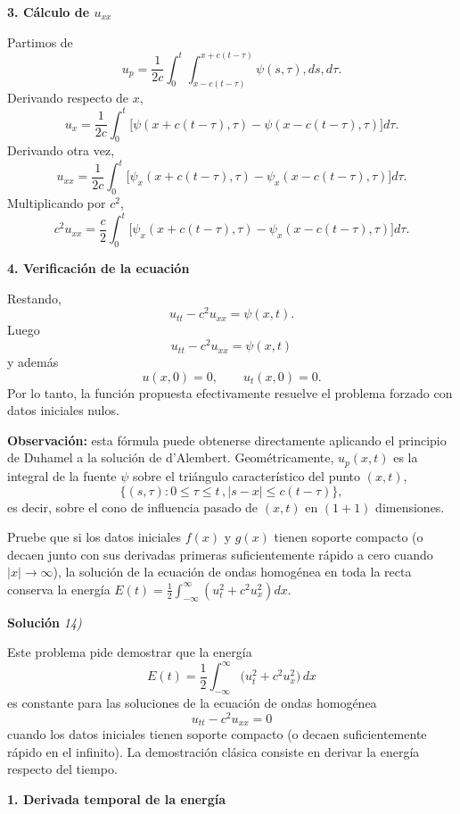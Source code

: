 \documentclass[11pt,spanish]{article}
\newcounter{problema}
\newcommand{\prob}{\stepcounter{problema} \vspace{.5cm} \noindent{\bf Problema \arabic{problema}: }}
\begin{document}
{\bf 3. Cálculo de $u_{xx}$}

Partimos de
$$
u_p=
\frac1{2c}
\int_0^t
\int_{x-c(t-\tau)}^{x+c(t-\tau)}
\psi(s,\tau),ds,d\tau .
$$
Derivando respecto de $x$,
$$
u_x
=
\frac1{2c}
\int_0^t
\Big[
\psi(x+c(t-\tau),\tau)
-
\psi(x-c(t-\tau),\tau)
\Big]
d\tau .
$$
Derivando otra vez,
$$
u_{xx}
=
\frac1{2c}
\int_0^t
\Big[
\psi_x(x+c(t-\tau),\tau)
-
\psi_x(x-c(t-\tau),\tau)
\Big]
d\tau .
$$
Multiplicando por $c^2$,
$$
c^2u_{xx}
=
\frac{c}{2}
\int_0^t
\Big[
\psi_x(x+c(t-\tau),\tau)
-
\psi_x(x-c(t-\tau),\tau)
\Big]
d\tau .
$$

{\bf 4. Verificación de la ecuación}

Restando,
$$
u_{tt}-c^2u_{xx}
=
\psi(x,t).
$$
Luego
$$
\boxed{
u_{tt}-c^2u_{xx}
=
\psi(x,t)
}
$$
y además
$$
\boxed{
u(x,0)=0,
\qquad
u_t(x,0)=0.
}
$$
Por lo tanto, la función propuesta efectivamente resuelve el problema forzado con datos iniciales nulos.

{\bf Observación:} esta fórmula puede obtenerse directamente aplicando el principio de Duhamel a la solución de d'Alembert. 
Geométricamente, $u_p(x,t)$ es la integral de la fuente $\psi$ sobre el triángulo característico del punto $(x,t)$,
$$
\{(s,\tau):0\le \tau\le t\,,|s-x|\le c(t-\tau)\},
$$
es decir, sobre el cono de influencia pasado de $(x,t)$ en $(1+1)$ dimensiones.







\prob Pruebe que si los datos iniciales \(f(x)\) y \(g(x)\) tienen soporte compacto (o decaen junto con sus derivadas primeras suficientemente rápido a cero cuando \(|x|\to\infty\)), la solución de la ecuación de ondas homogénea en toda la recta conserva la energía \(E(t)=\frac{1}{2}\int_{-\infty}^{\infty}\left(u_t^2+c^2u_x^2\right)dx\).

\vspace{0.5cm}
{\bf Soluci\'on }{\em 14)}
\vspace{0.5cm}

Este problema pide demostrar que la energía
$$
E(t)=\frac12\int_{-\infty}^{\infty}
\Big(
u_t^2+c^2u_x^2
\Big)\,dx
$$
es constante para las soluciones de la ecuación de ondas homogénea
$$
u_{tt}-c^2u_{xx}=0
$$
cuando los datos iniciales tienen soporte compacto (o decaen suficientemente rápido en el infinito). 
La demostración clásica consiste en derivar la energía respecto del tiempo.

{\bf 1. Derivada temporal de la energía}
\end{document}
